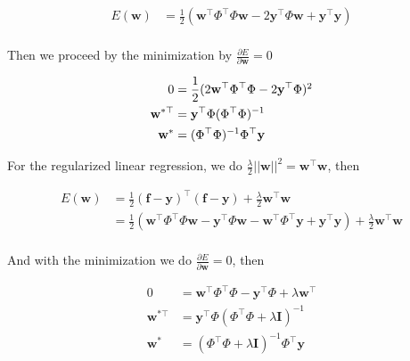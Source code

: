\begin{appendices}
\begin{align*}
  E(\mathbf{w}) &= \frac{1}{2}(\mathbf{w}^\top \Phi^\top \Phi \mathbf{w}  - 2\mathbf{y}^\top \Phi \mathbf{w} + \mathbf{y}^\top \mathbf{y}) \nonumber \\
\end{align*}

Then we proceed by the minimization by $\frac{\partial E}{\partial \mathbf{w}} = 0$

\begin{align}
  0 &= \frac{1}{2}(2\mathbf{w}^\top \Phi^\top \Phi - 2\mathbf{y}^\top \Phi) \footnotemark[2] \nonumber \\
  \mathbf{w}^{*\top} &= \mathbf{y}^\top \Phi (\Phi^\top \Phi) ^{-1} \nonumber \\
  \mathbf{w}^{*} &= (\Phi^\top \Phi)^{-1}\Phi^\top \mathbf{y} 
\end{align}

For the regularized linear regression, we do $\frac{\lambda}{2} ||\mathbf{w}||^2 = \mathbf{w}^\top \mathbf{w}$, then

\begin{align*}
  E(\mathbf{w}) &= \frac{1}{2}(\mathbf{f} - \mathbf{y})^\top (\mathbf{f} - \mathbf{y}) + \frac{\lambda}{2} \mathbf{w}^\top \mathbf{w}\\
                &= \frac{1}{2}(\mathbf{w}^\top \Phi^\top \Phi \mathbf{w}  - \mathbf{y}^\top \Phi \mathbf{w} - \mathbf{w}^\top \Phi^\top \mathbf{y} + \mathbf{y}^\top \mathbf{y}) + \frac{\lambda}{2} \mathbf{w}^\top \mathbf{w} \nonumber \\
\end{align*}

And with the minimization we do $\frac{\partial E}{\partial \mathbf{w}} = 0$, then

\begin{align}
  0 &= \mathbf{w}^\top \Phi^\top \Phi - \mathbf{y}^\top \Phi + \lambda \mathbf{w}^\top\nonumber \\
  \mathbf{w}^{*\top} &= \mathbf{y}^\top \Phi (\Phi^\top \Phi + \lambda \mathbf{I}) ^{-1} \nonumber \\
  \mathbf{w}^{*} &= (\Phi^\top \Phi + \lambda \mathbf{I})^{-1}\Phi^\top \mathbf{y} 
\end{align}


\end{appendices}
